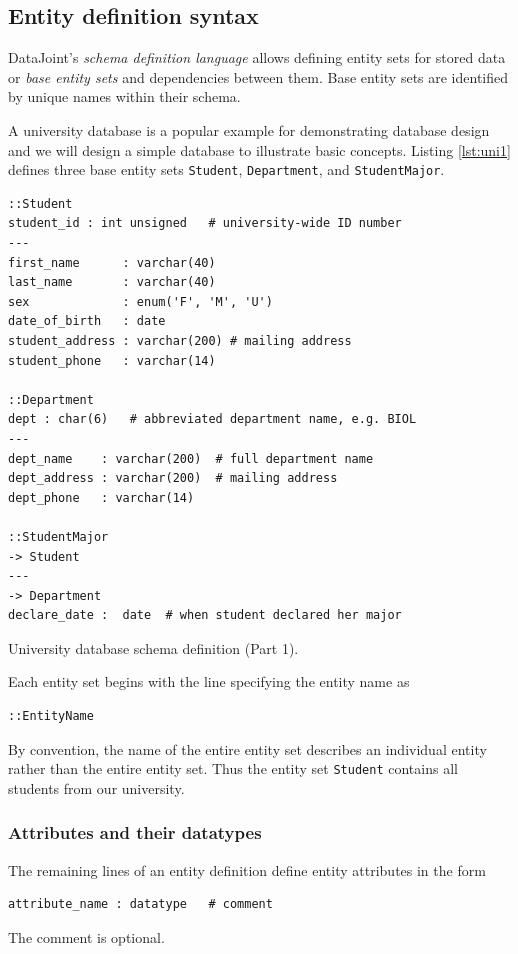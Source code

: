 \documentclass[letter,10pt]{article}
\newcommand{\datajoint}{DataJoint\xspace}
\begin{document}
\subsection{Entity definition syntax}
\datajoint's  \emph{schema definition language} allows defining entity sets for stored data or \emph{base entity sets} and dependencies between them. 
Base entity sets are identified by unique names within their schema. 

A university database is a popular example for demonstrating database design and we will design a simple database to illustrate basic concepts. 
Listing \ref{lst:uni1} defines three base entity sets {\tt Student}, {\tt Department}, and {\tt StudentMajor}.

\begin{lstfloat*}
\begin{lstlisting}[language=dj]
::Student     
student_id : int unsigned   # university-wide ID number 
---
first_name      : varchar(40)
last_name       : varchar(40)
sex             : enum('F', 'M', 'U')
date_of_birth   : date
student_address : varchar(200) # mailing address
student_phone   : varchar(14) 

::Department 
dept : char(6)   # abbreviated department name, e.g. BIOL
---
dept_name    : varchar(200)  # full department name
dept_address : varchar(200)  # mailing address
dept_phone   : varchar(14)  

::StudentMajor
-> Student
---
-> Department
declare_date :  date  # when student declared her major  
\end{lstlisting}
\caption{University database schema definition (Part 1).}
\label{lst:uni1}
\end{lstfloat*}

Each entity set begins with the line specifying the entity name as 
\begin{lstlisting}[language=dj, frame=none]
::EntityName 
\end{lstlisting}

By convention, the name of the entire entity set describes an individual entity rather than the entire entity set.  
Thus the entity set {\tt Student} contains all students from our university. 

\subsubsection{Attributes and their datatypes}
The remaining lines of an entity definition define entity attributes in the form
\begin{lstlisting}[language=dj, frame=none]
attribute_name : datatype   # comment
\end{lstlisting}
The comment is optional.
\end{document}
